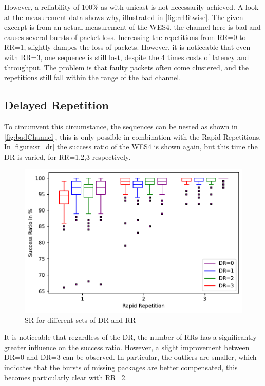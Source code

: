 However, a reliability of 100\% as with unicast is not necessarily achieved.
A look at the measurement data shows why, illustrated in \cref{fig:rrBitwise}.
The given excerpt is from an actual measurement of the WES4, 
the channel here is bad and causes several bursts of packet loss.
Increasing the repetitions from RR=0 to RR=1, slightly dampes the loss of packets.
However, it is noticeable that even with RR=3,
one sequence is still lost, despite the 4 times costs of latency and throughput.
The problem is that faulty packets often come clustered, 
and the repetitions still fall within the range of the bad channel.

\subsection*{Delayed Repetition}

To circumvent this circumstance, the sequences can be nested as shown in \cref{fig:badChannel},
this is only possible in combination with the Rapid Repetitions.
In \cref{figure:sr_dr} the success ratio of the WES4 is shown again,
but this time the DR is varied, for RR=1,2,3 respectively.

\begin{figure}[h]
	\centering
	\includegraphics[scale=0.8]{../Plot2/Graphs/SR_per_DR.pdf}
	\caption{SR for different sets of DR and RR}
	\label{fig:sr_dr}
\end{figure}

It is noticeable that regardless of the DR, the number of RRs has a significantly greater influence on the success ratio.
However, a slight improvement between DR=0 and DR=3 can be observed.
In particular, the outliers are smaller, which indicates that the bursts of missing packages are better compensated,
this becomes particularly clear with RR=2.

